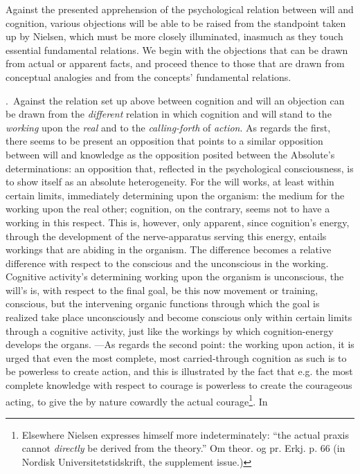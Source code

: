 \documentclass[12pt,a4paper]{book}
\begin{document}
Against the presented apprehension of the psychological relation between will and cognition,
various objections will be able to be raised from the standpoint taken up by Nielsen, which
must be more closely illuminated, inasmuch as they touch essential fundamental relations. We
begin with the objections that can be drawn from actual or apparent facts, and proceed thence
to those that are drawn from conceptual analogies and from the concepts' fundamental relations.

\medskip

.~Against the relation set up above between cognition and will an objection can be
drawn from the \emph{different} relation in which cognition and will stand to the \emph{working} upon the
\emph{real} and to the \emph{calling-forth} of \emph{action}. As regards the first, there seems to be present an
opposition that points to a similar opposition between will and knowledge as the opposition
posited between the Absolute's determinations: an opposition that, reflected in the
psychological consciousness, is to show itself as an absolute heterogeneity. For the will
works, at least within certain limits, immediately determining upon the organism: the medium
for the working upon the real other; cognition, on the contrary, seems not to have a working
in this respect. This is, however, only apparent, since cognition's energy, through the
development of the nerve-apparatus serving this energy, entails workings that are abiding in
the organism. The difference becomes a relative difference with respect to the conscious and
the unconscious in the working. Cognitive activity's determining working upon the organism is
unconscious, the will's is, with respect to the final goal, be this now movement or training,
conscious, but the intervening organic functions through which the goal is realized take place
unconsciously and become conscious only within certain limits through a cognitive activity,
just like the workings by which cognition-energy develops the organs. ---As regards the second
point: the working upon action, it is urged that even the most complete, most carried-through
cognition as such is to be powerless to create action, and this is illustrated by the fact that
e.g. the most complete knowledge with respect to courage is powerless to create the courageous
acting, to give the by nature cowardly the actual courage\footnote{Elsewhere Nielsen expresses
himself more indeterminately: ``the actual praxis cannot \emph{directly} be derived from the theory.''
Om theor. og pr. Erkj. p. 66 (in Nordisk Universitetstidskrift, the supplement issue.)}. In
\end{document}

